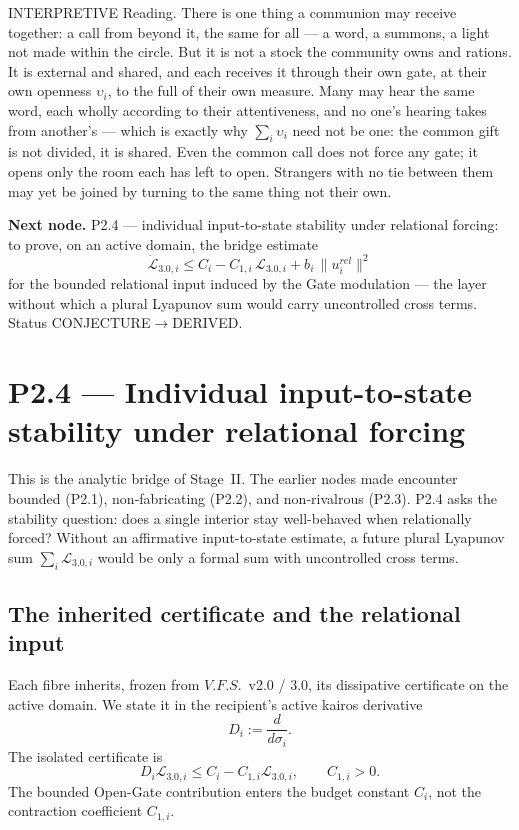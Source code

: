 \documentclass[11pt,a4paper]{article}
\def\mathrm#1{#1}%
\def\emph#1{#1}%
\newcommand{\VFS}{\ensuremath{\mathrm{V.F.S.}}}
\newcommand{\stDerived}{\textcolor{cDer}{\textsf{\small DERIVED}}}
\newcommand{\stInterp}{\textcolor{cInt}{\textsf{\small INTERPRETIVE}}}
\newcommand{\stConj}{\textcolor{cCon}{\textsf{\small CONJECTURE}}}
\theoremstyle{definition}
\theoremstyle{plain}
\theoremstyle{remark}
\begin{document}
\medskip
\stInterp\quad
\emph{Reading.}
There is one thing a communion may receive together: a call from beyond it, the same for
all --- a word, a summons, a light not made within the circle. But it is not a stock the
community owns and rations. It is external and shared, and each receives it through their own
gate, at their own openness \(\upsilon_i\), to the full of their own measure. Many may hear the
same word, each wholly according to their attentiveness, and no one's hearing takes from
another's --- which is exactly why \(\sum_i \upsilon_i\) need not be one: the common gift is not
divided, it is shared. Even the common call does not force any gate; it opens only the room
each has left to open. Strangers with no tie between them may yet be joined by turning to the
same thing not their own.

\medskip
\textbf{Next node.} P2.4 --- individual input-to-state stability under relational forcing:
to prove, on an active domain, the bridge estimate
\[
\dot{\mathcal L}_{3.0,i}\le C_i-C_{1,i}\,\mathcal L_{3.0,i}+b_i\,\lVert u^{\mathrm{rel}}_i\rVert^2
\]
for the bounded relational input induced by the Gate modulation --- the layer without which
a plural Lyapunov sum would carry uncontrolled cross terms. Status \stConj\(\to\)\stDerived.

\section{P2.4 --- Individual input-to-state stability under relational forcing}

This is the analytic bridge of Stage~II. The earlier nodes made encounter bounded
(P2.1), non-fabricating (P2.2), and non-rivalrous (P2.3). P2.4 asks the stability
question: does a single interior stay well-behaved when relationally forced? Without an
affirmative input-to-state estimate, a future plural Lyapunov sum
\(\sum_i\mathcal L_{3.0,i}\) would be only a formal sum with uncontrolled cross terms.

\subsection{The inherited certificate and the relational input}

Each fibre inherits, frozen from \VFS\ v2.0 / 3.0, its dissipative certificate on
the active domain. We state it in the recipient's active kairos derivative
\[
D_i:=\frac{d}{d\sigma_i}.
\]
The isolated certificate is
\[
D_i\mathcal L_{3.0,i}
\le
C_i-C_{1,i}\mathcal L_{3.0,i},
\qquad
C_{1,i}>0.
\tag{H1}
\]
The bounded Open-Gate contribution enters the budget constant \(C_i\), not the
contraction coefficient \(C_{1,i}\).
\end{document}
